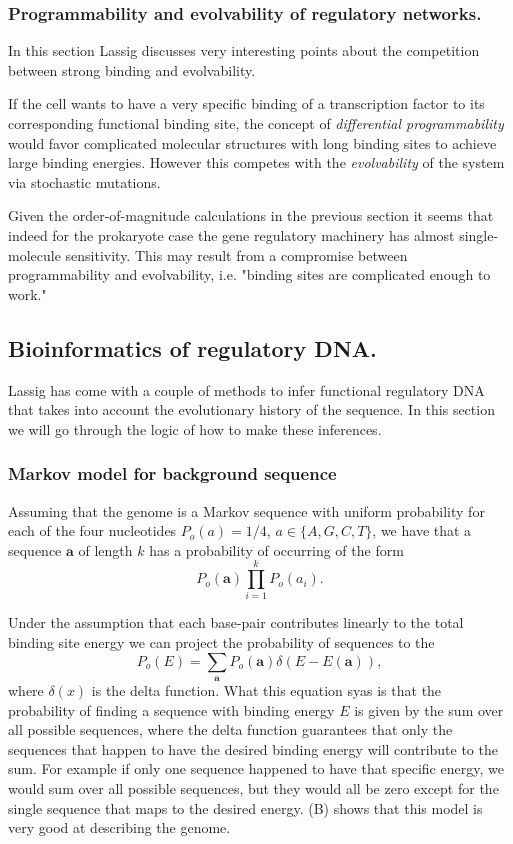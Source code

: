 \subsubsection{Programmability and evolvability of regulatory networks.}
In this section Lassig discusses very interesting points about the competition
between strong binding and evolvability.

If the cell wants to have a very specific binding of a transcription factor to
its corresponding functional binding site, the concept of {\it differential
programmability} would favor complicated molecular structures with long binding
sites to achieve large binding energies. However this competes with the {\it
evolvability} of the system via stochastic mutations.

Given the order-of-magnitude calculations in the previous section it seems that
indeed for the prokaryote case the gene regulatory machinery has almost single-
molecule sensitivity. This may result from a compromise between programmability
and evolvability, i.e. "binding sites are complicated enough to work."

\subsection{Bioinformatics of regulatory DNA.}
Lassig has come with a couple of methods to infer functional regulatory DNA that
takes into account the evolutionary history of the sequence. In this section we
will go through the logic of how to make these inferences.

\subsubsection{Markov model for background sequence}

Assuming that the genome is a Markov sequence with uniform probability for each
of the four nucleotides $P_o(a) = 1/4$, $a \in \{A, G, C, T \}$, we have that a
sequence $\mathbf{a}$ of length $k$ has a probability of occurring of the form
\begin{equation}
  P_o(\mathbf{a}) \prod_{i=1}^k P_o(a_i).
\end{equation}

Under the assumption that each base-pair contributes linearly to the total
binding site energy we can project the probability of sequences to the
\begin{equation}
  P_o(E) = \sum_{\mathbf{a}} P_o(\mathbf{a}) \delta(E - E(\mathbf{a})),
\end{equation}
where $\delta(x)$ is the delta function. What this equation syas is that the
probability of finding a sequence with binding energy $E$ is given by the sum
over all possible sequences, where the delta function guarantees that only the
sequences that happen to have the desired binding energy will contribute to the
sum. For example if only one sequence happened to have that specific energy, we
would sum over all possible sequences, but they would all be zero except for the
single sequence that maps to the desired energy. (B)
shows that this model is very good at describing the genome.

